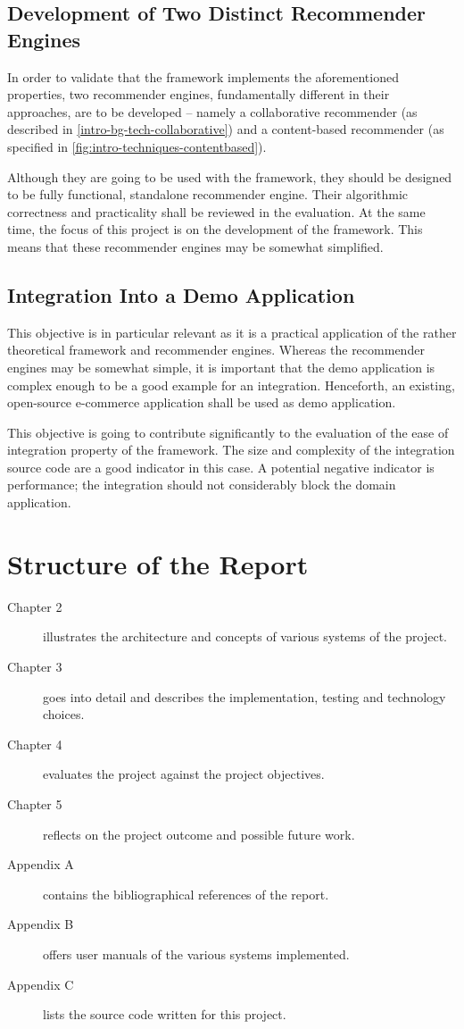 \subsection{Development of Two Distinct Recommender Engines}
\label{intro-objectives-engines}

In order to validate that the framework implements the aforementioned properties, two recommender engines, fundamentally different in their approaches, are to be developed -- namely a collaborative recommender (as described in \ref{intro-bg-tech-collaborative}) and a content-based recommender (as specified in \ref{fig:intro-techniques-contentbased}).

Although they are going to be used with the framework, they should be designed to be fully functional, standalone recommender engine. Their algorithmic correctness and practicality shall be reviewed in the evaluation. At the same time, the focus of this project is on the development of the framework. This means that these recommender engines may be somewhat simplified.

\subsection{Integration Into a Demo Application}
\label{intro-objectives-demo}

This objective is in particular relevant as it is a practical application of the rather theoretical framework and recommender engines. Whereas the recommender engines may be somewhat simple, it is important that the demo application is complex enough to be a good example for an integration. Henceforth, an existing, open-source e-commerce application shall be used as demo application.

This objective is going to contribute significantly to the evaluation of the ease of integration property of the framework. The size and complexity of the integration source code are a good indicator in this case. A potential negative indicator is performance; the integration should not considerably block the domain application.

\section{Structure of the Report}

\begin{description}
    \item[Chapter 2] illustrates the architecture and concepts of various systems of the project.
    \item[Chapter 3] goes into detail and describes the implementation, testing and technology choices.
    \item[Chapter 4] evaluates the project against the project objectives.
    \item[Chapter 5] reflects on the project outcome and possible future work.
    \item[Appendix A] contains the bibliographical references of the report.
    \item[Appendix B] offers user manuals of the various systems implemented.
    \item[Appendix C] lists the source code written for this project.
\end{description}